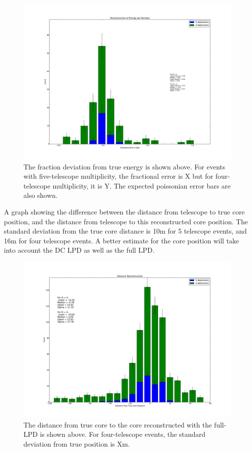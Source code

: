 \documentclass{article}
\begin{document}
\begin{figure}
\begin{center}
\includegraphics[width=\textwidth]{rawepn}
\caption{The fraction deviation from true energy is shown above. For events with five-telescope multiplicity, the fractional error is X but for four-telescope multiplicity, it is Y. The expected poissonian error bars are also shown.}
\label{fig:rawepn}
\end{center}
\end{figure}  
A graph showing the difference between the distance from telescope to true core position, and the distance from telescope to this reconstructed core position. The standard deviation from the true core distance  is 10m for 5 telescope events, and 16m for four telescope events. A better estimate for the core position will take into account the DC LPD as well as the full LPD.

\begin{figure}
\begin{center}
\includegraphics[width=\textwidth]{rawcoredistance}
\caption{The distance from true core to the core reconstructed with the full-LPD is shown above. For four-telescope events, the standard deviation from true position is Xm. }
\label{fig:rawcoredistance}
\end{center}
\end{figure} 
\end{document}
